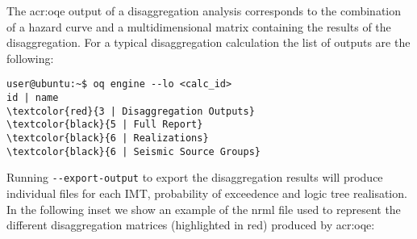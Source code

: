The \glsdesc{acr:oqe} output of a disaggregation analysis corresponds to the
combination of a hazard curve and a multidimensional matrix containing the
results of the disaggregation. For a typical disaggregation calculation the
list of outputs are the following:

\begin{Verbatim}[frame=single, commandchars=\\\{\}, fontsize=\small]
user@ubuntu:~$ oq engine --lo <calc_id>
id | name
\textcolor{red}{3 | Disaggregation Outputs}
\textcolor{black}{5 | Full Report}
\textcolor{black}{6 | Realizations}
\textcolor{black}{6 | Seismic Source Groups}
\end{Verbatim}
%

Running \texttt{-{}-export-output} to export the disaggregation results will produce individual files for each IMT, probability of exceedence and logic tree realisation. In the following inset we show an example of the nrml file used to represent the different disaggregation matrices (highlighted in red) produced by
\gls{acr:oqe}:


